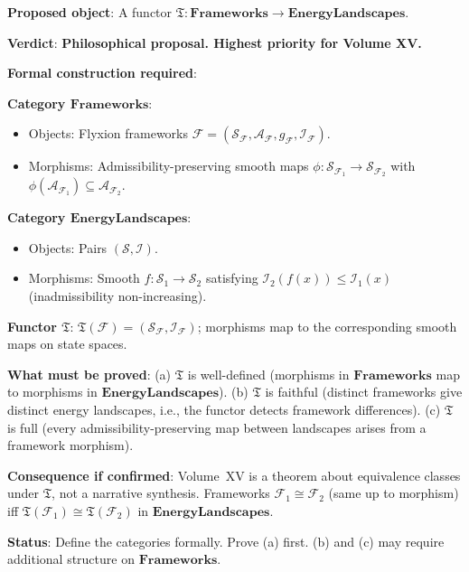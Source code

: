 \documentclass[11pt, a4paper]{book}
\theoremstyle{flyxion}
\theoremstyle{remark}
\begin{document}
\begin{flybox}
\textbf{Proposed object}: A functor $\mathfrak{T}:
\mathbf{Frameworks} \to \mathbf{EnergyLandscapes}$.

\textbf{Verdict}: \textbf{Philosophical proposal. Highest priority
for Volume XV.}

\textbf{Formal construction required}:

\noindent\textbf{Category $\mathbf{Frameworks}$}:
\begin{itemize}[nosep]
\item Objects: Flyxion frameworks $\mathcal{F} =
  (\mathcal{S}_\mathcal{F}, \mathcal{A}_\mathcal{F},
  g_\mathcal{F}, \mathcal{I}_\mathcal{F})$.
\item Morphisms: Admissibility-preserving smooth maps
  $\phi: \mathcal{S}_{\mathcal{F}_1} \to \mathcal{S}_{\mathcal{F}_2}$
  with $\phi(\mathcal{A}_{\mathcal{F}_1}) \subseteq
  \mathcal{A}_{\mathcal{F}_2}$.
\end{itemize}

\noindent\textbf{Category $\mathbf{EnergyLandscapes}$}:
\begin{itemize}[nosep]
\item Objects: Pairs $(\mathcal{S}, \mathcal{I})$.
\item Morphisms: Smooth $f: \mathcal{S}_1 \to \mathcal{S}_2$
  satisfying $\mathcal{I}_2(f(x)) \leq \mathcal{I}_1(x)$
  (inadmissibility non-increasing).
\end{itemize}

\noindent\textbf{Functor $\mathfrak{T}$}: $\mathfrak{T}(\mathcal{F})
= (\mathcal{S}_\mathcal{F}, \mathcal{I}_\mathcal{F})$; morphisms
map to the corresponding smooth maps on state spaces.

\textbf{What must be proved}:
(a) $\mathfrak{T}$ is well-defined (morphisms in
$\mathbf{Frameworks}$ map to morphisms in $\mathbf{EnergyLandscapes}$).
(b) $\mathfrak{T}$ is faithful (distinct frameworks give distinct
energy landscapes, i.e., the functor detects framework differences).
(c) $\mathfrak{T}$ is full (every admissibility-preserving map
between landscapes arises from a framework morphism).

\textbf{Consequence if confirmed}: Volume~XV is a theorem about
equivalence classes under $\mathfrak{T}$, not a narrative synthesis.
Frameworks $\mathcal{F}_1 \cong \mathcal{F}_2$ (same up to
morphism) iff $\mathfrak{T}(\mathcal{F}_1) \cong
\mathfrak{T}(\mathcal{F}_2)$ in $\mathbf{EnergyLandscapes}$.

\textbf{Status}: Define the categories formally. Prove (a) first.
(b) and (c) may require additional structure on $\mathbf{Frameworks}$.
\end{flybox}
\end{document}
